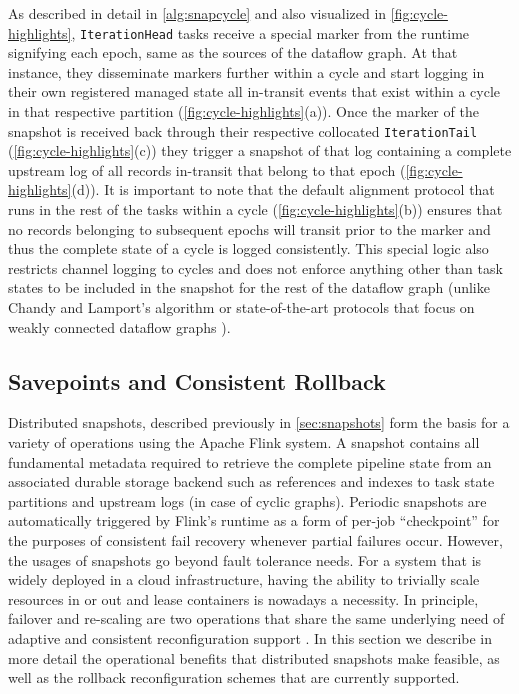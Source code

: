 As described in detail in \autoref{alg:snapcycle} and also visualized in \autoref{fig:cycle-highlights}, \texttt{IterationHead} tasks receive a special marker from the runtime signifying each epoch, same as the sources of the dataflow graph. At that instance, they disseminate markers further within a cycle and start logging in their own registered managed state all in-transit events that exist within a cycle in that respective partition (\autoref{fig:cycle-highlights}(a)). Once the marker of the snapshot is received back through their respective collocated \texttt{IterationTail} (\autoref{fig:cycle-highlights}(c)) they trigger a snapshot of that log containing a complete upstream log of all records in-transit that belong to that epoch (\autoref{fig:cycle-highlights}(d)). It is important to note that the default alignment protocol that runs in the rest of the tasks within a cycle (\autoref{fig:cycle-highlights}(b)) ensures that no records belonging to subsequent epochs will transit prior to the marker and thus the complete state of a cycle is logged consistently. This special logic also restricts channel logging to cycles and does not enforce anything other than task states to be included in the snapshot for the rest of the dataflow graph (unlike Chandy and Lamport's \cite{chandy1985distributed} algorithm or state-of-the-art protocols that focus on weakly connected dataflow graphs \cite{elnozahy2002survey,jacques2016consistent,murray2013naiad}).


\subsection{Savepoints and Consistent Rollback}

Distributed snapshots, described previously in \autoref{sec:snapshots} form the basis for a variety of operations using the Apache Flink system. A snapshot contains all fundamental metadata required to retrieve the complete pipeline state from an associated durable storage backend such as references and indexes to task state partitions and upstream logs (in case of cyclic graphs). Periodic snapshots are automatically triggered by Flink's runtime as a form of per-job ``checkpoint'' for the purposes of consistent fail recovery whenever partial failures occur. However, the usages of snapshots go beyond fault tolerance needs. For a system that is widely deployed in a cloud infrastructure, having the ability to trivially scale resources in or out and lease containers is nowadays a necessity. In principle, failover and re-scaling are two operations that share the same underlying need of adaptive and consistent reconfiguration support \cite{castro2013integrating}. In this section we describe in more detail the operational benefits that distributed snapshots make feasible, as well as the rollback reconfiguration schemes that are currently supported.

